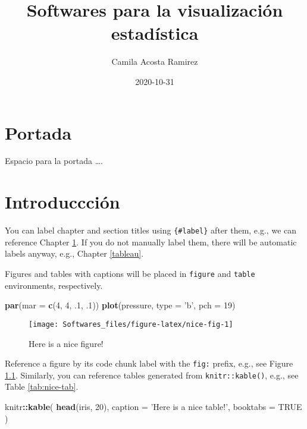\documentclass[
]{book}
\title{Softwares para la visualización estadística}
\author{Camila Acosta Ramirez}
\date{2020-10-31}
\newenvironment{Shaded}{\begin{snugshade}}{\end{snugshade}}
\newcommand{\DataTypeTok}[1]{\textcolor[rgb]{0.13,0.29,0.53}{#1}}
\newcommand{\DecValTok}[1]{\textcolor[rgb]{0.00,0.00,0.81}{#1}}
\newcommand{\FloatTok}[1]{\textcolor[rgb]{0.00,0.00,0.81}{#1}}
\newcommand{\KeywordTok}[1]{\textcolor[rgb]{0.13,0.29,0.53}{\textbf{#1}}}
\newcommand{\NormalTok}[1]{#1}
\newcommand{\OperatorTok}[1]{\textcolor[rgb]{0.81,0.36,0.00}{\textbf{#1}}}
\newcommand{\OtherTok}[1]{\textcolor[rgb]{0.56,0.35,0.01}{#1}}
\newcommand{\StringTok}[1]{\textcolor[rgb]{0.31,0.60,0.02}{#1}}
\begin{document}
\maketitle

{
\setcounter{tocdepth}{1}
\tableofcontents
}
\hypertarget{portada}{%
\chapter*{Portada}\label{portada}}

Espacio para la portada \ldots.

\hypertarget{intro}{%
\chapter{Introduccción}\label{intro}}

You can label chapter and section titles using \texttt{\{\#label\}} after them, e.g., we can reference Chapter \ref{intro}. If you do not manually label them, there will be automatic labels anyway, e.g., Chapter \ref{tableau}.

Figures and tables with captions will be placed in \texttt{figure} and \texttt{table} environments, respectively.

\begin{Shaded}
\begin{Highlighting}[]
\KeywordTok{par}\NormalTok{(}\DataTypeTok{mar =} \KeywordTok{c}\NormalTok{(}\DecValTok{4}\NormalTok{, }\DecValTok{4}\NormalTok{, }\FloatTok{.1}\NormalTok{, }\FloatTok{.1}\NormalTok{))}
\KeywordTok{plot}\NormalTok{(pressure, }\DataTypeTok{type =} \StringTok{'b'}\NormalTok{, }\DataTypeTok{pch =} \DecValTok{19}\NormalTok{)}
\end{Highlighting}
\end{Shaded}

\begin{figure}

{\centering \texttt{[image: Softwares\_files/figure-latex/nice-fig-1]} 

}

\caption{Here is a nice figure!}\label{fig:nice-fig}
\end{figure}

Reference a figure by its code chunk label with the \texttt{fig:} prefix, e.g., see Figure \ref{fig:nice-fig}. Similarly, you can reference tables generated from \texttt{knitr::kable()}, e.g., see Table \ref{tab:nice-tab}.

\begin{Shaded}
\begin{Highlighting}[]
\NormalTok{knitr}\OperatorTok{::}\KeywordTok{kable}\NormalTok{(}
  \KeywordTok{head}\NormalTok{(iris, }\DecValTok{20}\NormalTok{), }\DataTypeTok{caption =} \StringTok{'Here is a nice table!'}\NormalTok{,}
  \DataTypeTok{booktabs =} \OtherTok{TRUE}
\NormalTok{)}
\end{Highlighting}
\end{Shaded}
\end{document}
